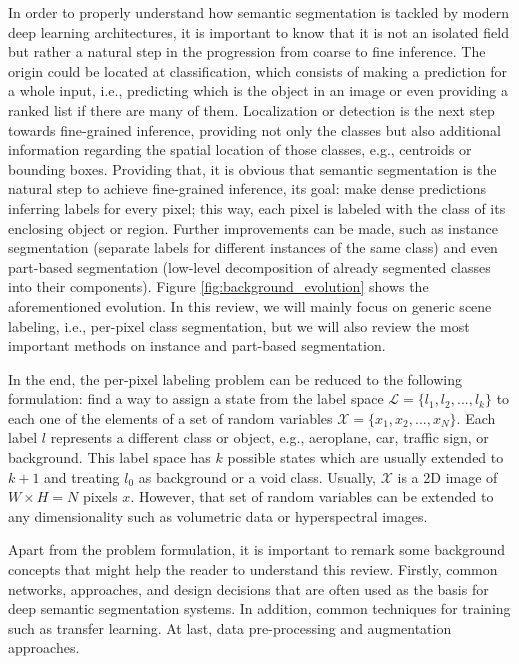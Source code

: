 In order to properly understand how semantic segmentation is tackled by modern deep learning architectures, it is important to know that it is not an isolated field but rather a natural step in the progression from coarse to fine inference. The origin could be located at classification, which consists of making a prediction for a whole input, i.e., predicting which is the object in an image or even providing a ranked list if there are many of them. Localization or detection is the next step towards fine-grained inference, providing not only the classes but also additional information regarding the spatial location of those classes, e.g., centroids or bounding boxes. Providing that, it is obvious that semantic segmentation is the natural step to achieve fine-grained inference, its goal: make dense predictions inferring labels for every pixel; this way, each pixel is labeled with the class of its enclosing object or region. Further improvements can be made, such as instance segmentation (separate labels for different instances of the same class) and even part-based segmentation (low-level decomposition of already segmented classes into their components). Figure \ref{fig:background_evolution} shows the aforementioned evolution. In this review, we will mainly focus on generic scene labeling, i.e., per-pixel class segmentation, but we will also review the most important methods on instance and part-based segmentation.

In the end, the per-pixel labeling problem can be reduced to the following formulation: find a way to assign a state from the label space $\mathcal{L} = \{l_1, l_2, ... , l_k\}$ to each one of the elements of a set of random variables $\mathcal{X} = \{x_1, x_2, ... , x_N\}$. Each label $l$ represents a different class or object, e.g., aeroplane, car, traffic sign, or background. This label space has $k$ possible states which are usually extended to $k+1$ and treating $l_0$ as background or a void class. Usually, $\mathcal{X}$ is a \acs{2D} image of $W\times H = N$ pixels $x$. However, that set of random variables can be extended to any dimensionality such as volumetric data or hyperspectral images.

Apart from the problem formulation, it is important to remark some background concepts that might help the reader to understand this review. Firstly, common networks, approaches, and design decisions that are often used as the basis for deep semantic segmentation systems. In addition, common techniques for training such as transfer learning. At last, data pre-processing and augmentation approaches.

